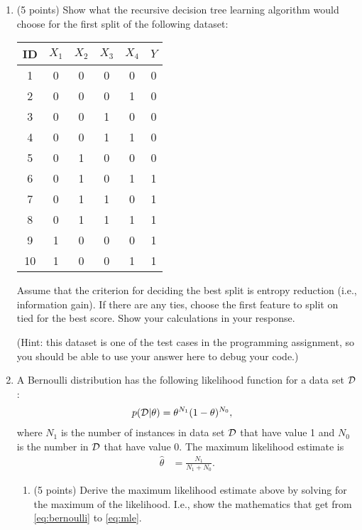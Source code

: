 \documentclass[10pt]{article}
\begin{document}
\begin{enumerate}

\item (5 points) Show what the recursive decision tree learning algorithm would choose for the first split of the following dataset:

\begin{tabular}{c|cccc|c}
\toprule
ID & $X_1$ & $X_2$& $X_3$ & $X_4$ & $Y$\\
\midrule
1 & 0 & 0 & 0 & 0 & 0\\
2 & 0 & 0 & 0 & 1 & 0\\
3 & 0 & 0 & 1 & 0 & 0\\
4 & 0 & 0 & 1 & 1 & 0\\
5 & 0 & 1 & 0 & 0 & 0\\
6 & 0 & 1 & 0 & 1 & 1\\ 
7 & 0 & 1 & 1 & 0 & 1\\ 
8 & 0 & 1 & 1 & 1 & 1\\ 
9 & 1 & 0 & 0 & 0 & 1\\ 
10 & 1 & 0 & 0 & 1 & 1\\ 
\bottomrule
\end{tabular}

Assume that the criterion for deciding the best split is entropy reduction (i.e., information gain). If there are any ties, choose the first feature to split on tied for the best score. Show your calculations in your response.

(Hint: this dataset is one of the test cases in the programming assignment, so you should be able to use your answer here to debug your code.)

\item A Bernoulli distribution has the following likelihood function for a data set $\cal D$:
\begin{align}
p({\cal D} | \theta) &= \theta^{N_1} (1 - \theta)^{N_0},
\label{eq:bernoulli}
\end{align}
where $N_1$ is the number of instances in data set $\cal D$ that have value 1 and $N_0$ is the number in $\cal D$ that have value 0. The maximum likelihood estimate is 
\begin{align}
\hat{\theta} &= \frac{N_1}{N_1 + N_0}.
\label{eq:mle}
\end{align}

\begin{enumerate}

\item (5 points) Derive the maximum likelihood estimate above by solving for the maximum of the likelihood. I.e., show the mathematics that get from \cref{eq:bernoulli} to \cref{eq:mle}.


\end{enumerate}
\end{enumerate}
\end{document}
